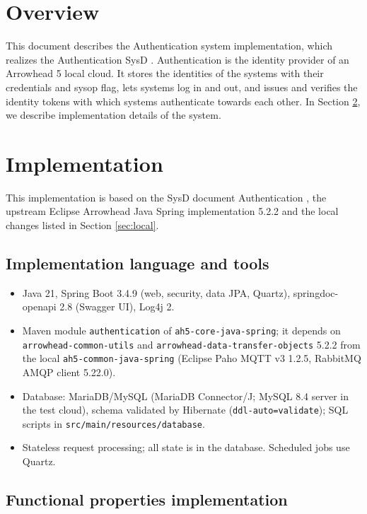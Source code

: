 \documentclass[a4paper]{arrowhead}
\begin{document}
\section{Overview}
\label{sec:overview}

This document describes the Authentication system implementation, which realizes the Authentication SysD \cite{auth-sysd}. Authentication is the identity provider of an Arrowhead 5 local cloud. It stores the identities of the systems with their credentials and sysop flag, lets systems log in and out, and issues and verifies the identity tokens with which systems authenticate towards each other.
In Section \ref{Implementation}, we describe implementation details of the system.

\newpage

\section{Implementation}
\label{Implementation}

This implementation is based on the SysD document Authentication \cite{auth-sysd}, the upstream Eclipse Arrowhead Java Spring implementation 5.2.2 \cite{ah5java} and the local changes listed in Section \ref{sec:local}.

\subsection{Implementation language and tools}
\begin{itemize}
\item Java 21, Spring Boot 3.4.9 (web, security, data JPA, Quartz), springdoc-openapi 2.8 (Swagger UI), Log4j 2.
\item Maven module \texttt{authentication} of \texttt{ah5-core-java-spring}; it depends on \texttt{arrowhead-common-utils} and \texttt{arrowhead-data-transfer-objects} 5.2.2 from the local \texttt{ah5-common-java-spring} (Eclipse Paho MQTT v3 1.2.5, RabbitMQ AMQP client 5.22.0).
\item Database: MariaDB/MySQL (MariaDB Connector/J; MySQL 8.4 server in the test cloud), schema validated by Hibernate (\texttt{ddl-auto=validate}); SQL scripts in \texttt{src/main/resources/database}.
\item Stateless request processing; all state is in the database. Scheduled jobs use Quartz.
\end{itemize}

\subsection{Functional properties implementation}
\end{document}
